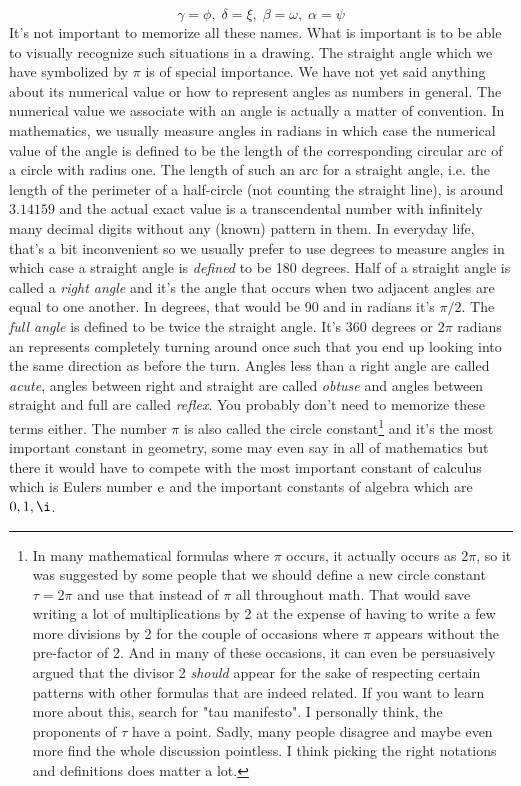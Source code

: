 \begin{equation}
  \gamma = \phi, \; \delta = \xi, \; \beta = \omega, \; \alpha = \psi
\end{equation}
It's not important to memorize all these names. What is important is to be able to visually recognize such situations in a drawing. The straight angle which we have symbolized by $\pi$ is of special importance. We have not yet said anything about its numerical value or how to represent angles as numbers in general. The numerical value we associate with an angle is actually a matter of convention. In mathematics, we usually measure angles in radians in which case the numerical value of the angle is defined to be the length of the corresponding circular arc of a circle with radius one. The length of such an arc for a straight angle, i.e. the length of the perimeter of a half-circle (not counting the straight line), is around $3.14159$ and the actual exact value is a transcendental number with infinitely many decimal digits without any (known) pattern in them. In everyday life, that's a bit inconvenient so we usually prefer to use degrees to measure angles in which case a straight angle is \emph{defined} to be 180 degrees. Half of a straight angle is called a \emph{right angle} and it's the angle that occurs when two adjacent angles are equal to one another. In degrees, that would be 90 and in radians it's $\pi / 2$. The \emph{full angle} is defined to be twice the straight angle. It's 360 degrees or $2 \pi$ radians an represents completely turning around once such that you end up looking into the same direction as before the turn. Angles less than a right angle are called \emph{acute}, angles between right and straight are called \emph{obtuse} and angles between straight and full are called \emph{reflex}. You probably don't need to memorize these terms either. The number $\pi$ is also called the circle constant\footnote{In many mathematical formulas where $\pi$ occurs, it actually occurs as $2 \pi$, so it was suggested by some people that we should define a new circle constant $\tau = 2 \pi$ and use that instead of $\pi$ all throughout math. That would save writing a lot of multiplications by 2 at the expense of having to write a few more divisions by 2 for the couple of occasions where $\pi$ appears without the pre-factor of 2. And in many of these occasions, it can even be persuasively argued that the divisor 2 \emph{should} appear for the sake of respecting certain patterns with other formulas that are indeed related. If you want to learn more about this, search for "tau manifesto". I personally think, the proponents of $\tau$ have a point. Sadly, many people disagree and maybe even more find the whole discussion pointless. I think picking the right notations and definitions does matter a lot.} and it's the most important constant in geometry, some may even say in all of mathematics but there it would have to compete with the most important constant of calculus which is Eulers number $\operatorname{\mathrm{e}}$ and the important constants of algebra which are $0,1, \i$.

